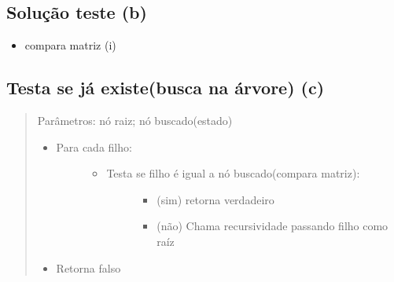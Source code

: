 \documentclass[letterpaper,10pt,openany,oneside,portuges]{sphinxmanual}
\begin{document}
\subsection{Solução teste (b)}
\label{\detokenize{pseudo:solucao-teste-b}}\begin{itemize}
\item {} 
compara matriz (i)

\end{itemize}

\begin{DUlineblock}{0em}
\item[] 
\item[] 
\end{DUlineblock}


\subsection{Testa se já existe(busca na árvore) (c)}
\label{\detokenize{pseudo:testa-se-ja-existe-busca-na-arvore-c}}\begin{quote}

Parâmetros: nó raiz; nó buscado(estado)
\begin{itemize}
\item {} \begin{description}
\item[{Para cada filho:}] \leavevmode\begin{itemize}
\item {} \begin{description}
\item[{Testa se filho é igual a nó buscado(compara matriz):}] \leavevmode\begin{itemize}
\item {} 
(sim) retorna verdadeiro

\item {} 
(não) Chama recursividade passando filho como raíz

\end{itemize}

\end{description}

\end{itemize}

\end{description}

\item {} 
Retorna falso

\end{itemize}
\end{quote}
\end{document}
